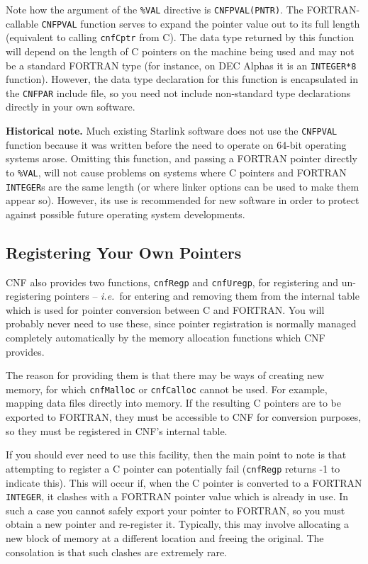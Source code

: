 \documentclass[twoside,11pt]{article}
\newcommand{\htmlref}[2]{#1}
\newcommand{\xlabel}[1]{}
\renewcommand{\_}{\texttt{\symbol{95}}}
\begin{document}
Note how the argument of the \texttt{\%VAL} directive is
\texttt{CNF\_PVAL(PNTR)}. The FORTRAN-callable 
\htmlref{\texttt{CNF\_PVAL}}{CNF_PVAL}
function serves to expand the pointer value out to its full length
(equivalent to calling 
\htmlref{\texttt{cnfCptr}}{cnfCptr}
from C). 
The data type returned by this function will depend on the length of C pointers 
on the machine being used and may not be a standard FORTRAN type (for
instance, on DEC Alphas it is an \texttt{INTEGER*8}
function). However, the data type declaration for this function is
encapsulated in the \texttt{CNF\_PAR} include file, so you need not
include non-standard type declarations directly in your own software.

{\bf{Historical note.}} Much existing Starlink software does not use the
\htmlref{\texttt{CNF\_PVAL}}{CNF_PVAL}
function because it was written before the need
to operate on 64-bit operating systems arose. Omitting this function,
and passing a FORTRAN pointer directly to \texttt{\%VAL}, will not
cause problems on systems where C pointers and FORTRAN
\texttt{INTEGER}s are the same length (or where linker options can be
used to make them appear so). However, its use is recommended for new
software in order to protect against possible future operating system
developments.

\subsection{\xlabel{registering_your_own_pointers}Registering Your Own
Pointers}

CNF also provides two functions, 
\htmlref{\texttt{cnfRegp}}{cnfRegp}
and
\htmlref{\texttt{cnfUregp}}{cnfUregp},
for registering and un-registering pointers --
\textit{i.e.}\ for entering and removing them from the internal table which is
used for pointer conversion between C and FORTRAN. You will probably
never need to use these, since pointer registration is normally
managed completely automatically by the memory allocation functions
which CNF provides.

The reason for providing them is that there may be ways of
creating new memory, for which \texttt{cnfMalloc} or \texttt{cnfCalloc} cannot
be used.
For example, mapping data files directly into memory. 
If the resulting C pointers are to be exported to FORTRAN,
they must be accessible to CNF for conversion purposes, so they must
be registered in CNF's internal table.

If you should ever need to use this facility, then the main point to
note is that attempting to register a C pointer can potentially fail
(\htmlref{\texttt{cnfRegp}}{cnfRegp} returns -1 to indicate this). 
This will occur if, when the C pointer is converted to a FORTRAN 
\texttt{INTEGER}, it
clashes with a FORTRAN pointer value which is already in use. In such
a case you cannot safely export your pointer to FORTRAN, so you must
obtain a new pointer and re-register it. Typically, this may involve
allocating a new block of memory at a different location and freeing
the original. The consolation is that such clashes are extremely rare.
\end{document}
